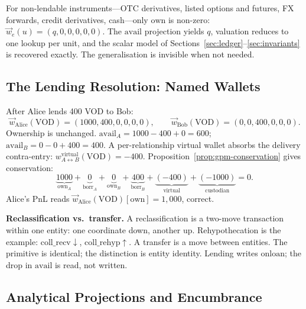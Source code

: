 \begin{remark}
For non-lendable instruments---OTC derivatives, listed options and futures, FX forwards, credit derivatives, cash---only $\mathrm{own}$ is non-zero: $\vec{w}_e(u) = (q,0,0,0,0,0)$. The $\mathrm{avail}$ projection yields $q$, valuation reduces to one lookup per unit, and the scalar model of Sections~\ref{sec:ledger}--\ref{sec:invariants} is recovered exactly. The generalisation is invisible when not needed.
\end{remark}

\subsection{The Lending Resolution: Named Wallets}
\label{sec:named-wallets}

After Alice lends 400 VOD to Bob:
\[
\vec{w}_{\mathrm{Alice}}(\text{VOD}) = (1000,400,0,0,0,0),\qquad \vec{w}_{\mathrm{Bob}}(\text{VOD}) = (0,0,400,0,0,0).
\]
Ownership is unchanged. $\mathrm{avail}_A = 1000-400+0 = 600$; $\mathrm{avail}_B = 0-0+400 = 400$. A per-relationship virtual wallet absorbs the delivery contra-entry: $w^{\mathrm{virtual}}_{A\leftrightarrow B}(\text{VOD}) = -400$. Proposition~\ref{prop:gpm-conservation} gives conservation:
\[
\underbrace{1000}_{\mathrm{own}_A} + \underbrace{0}_{\mathrm{borr}_A} + \underbrace{0}_{\mathrm{own}_B} + \underbrace{400}_{\mathrm{borr}_B} + \underbrace{(-400)}_{\text{virtual}} + \underbrace{(-1000)}_{\text{custodian}} = 0.
\]
Alice's PnL reads $\vec{w}_{\mathrm{Alice}}(\text{VOD})[\mathrm{own}] = 1{,}000$, correct.

\noindent\textbf{Reclassification vs.\ transfer.} A reclassification is a two-move transaction within one entity: one coordinate down, another up. Rehypothecation is the example: $\mathrm{coll\_recv}\downarrow$, $\mathrm{coll\_rehyp}\uparrow$. A transfer is a move between entities. The primitive is identical; the distinction is entity identity. Lending writes $\mathrm{onloan}$; the drop in $\mathrm{avail}$ is read, not written.

\subsection{Analytical Projections and Encumbrance}
\label{sec:projections}

